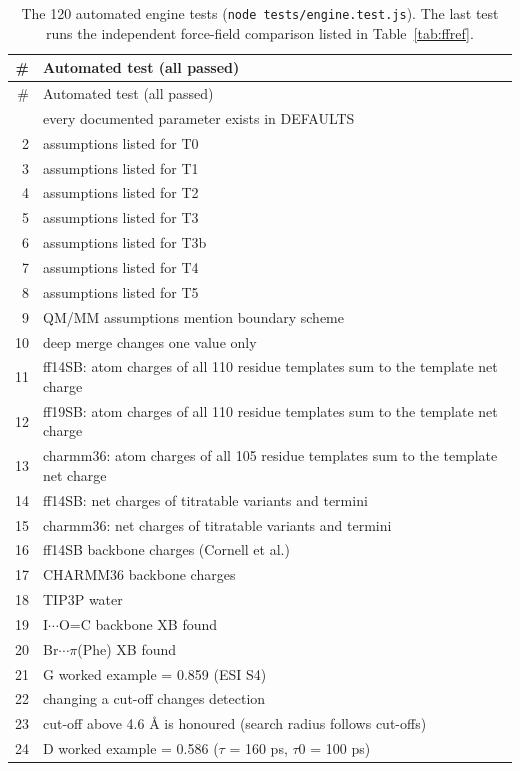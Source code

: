 {\scriptsize
\setlength{\tabcolsep}{3pt}
\begin{longtable}{rp{14.5cm}}
\caption{The 120 automated engine tests (\texttt{node tests/engine.test.js}). The last test runs the independent force-field comparison listed in Table~\ref{tab:ffref}.}\label{tab:tests}\\
\toprule
\# & Automated test (all passed)\\
\midrule
\endfirsthead
\toprule
\# & Automated test (all passed)\\
\midrule
\endhead
\bottomrule
\endlastfoot
1 & every documented parameter exists in DEFAULTS\\
2 & assumptions listed for T0\\
3 & assumptions listed for T1\\
4 & assumptions listed for T2\\
5 & assumptions listed for T3\\
6 & assumptions listed for T3b\\
7 & assumptions listed for T4\\
8 & assumptions listed for T5\\
9 & QM/MM assumptions mention boundary scheme\\
10 & deep merge changes one value only\\
11 & ff14SB: atom charges of all 110 residue templates sum to the template net charge\\
12 & ff19SB: atom charges of all 110 residue templates sum to the template net charge\\
13 & charmm36: atom charges of all 105 residue templates sum to the template net charge\\
14 & ff14SB: net charges of titratable variants and termini\\
15 & charmm36: net charges of titratable variants and termini\\
16 & ff14SB backbone charges (Cornell et al.)\\
17 & CHARMM36 backbone charges\\
18 & TIP3P water\\
19 & I$\cdots$O=C backbone XB found\\
20 & Br$\cdots\pi$(Phe) XB found\\
21 & G worked example = 0.859 (ESI S4)\\
22 & changing a cut-off changes detection\\
23 & cut-off above 4.6 \AA{} is honoured (search radius follows cut-offs)\\
24 & D worked example = 0.586 ($\tau$ = 160 ps, $\tau$0 = 100 ps)\\

\end{longtable}}
